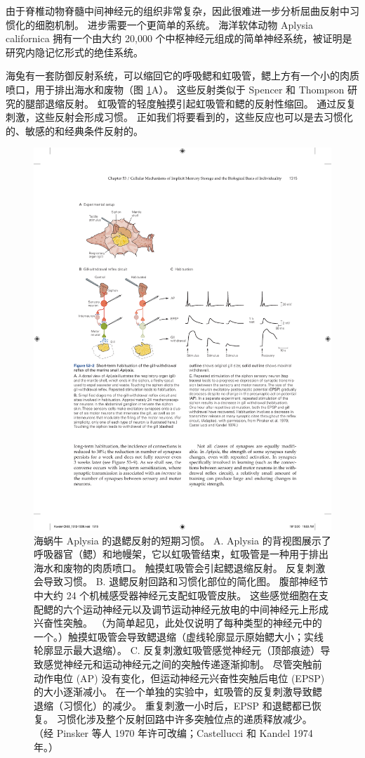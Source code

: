 由于脊椎动物脊髓中间神经元的组织非常复杂，因此很难进一步分析屈曲反射中习惯化的细胞机制。 进步需要一个更简单的系统。 海洋软体动物 Aplysia californica 拥有一个由大约 20,000 个中枢神经元组成的简单神经系统，被证明是研究内隐记忆形式的绝佳系统。

海兔有一套防御反射系统，可以缩回它的呼吸鳃和虹吸管，鳃上方有一个小的肉质喷口，用于排出海水和废物（图 \ref{fig:53_2}A）。 这些反射类似于 Spencer 和 Thompson 研究的腿部退缩反射。 虹吸管的轻度触摸引起虹吸管和鳃的反射性缩回。 通过反复刺激，这些反射会形成习惯。 正如我们将要看到的，这些反应也可以是去习惯化的、敏感的和经典条件反射的。

\begin{figure}[htbp]
	\centering
	\includegraphics[width=0.9\linewidth]{chap53/fig_53_2}
	\caption{海蜗牛 Aplysia 的退鳃反射的短期习惯。 A. Aplysia 的背视图展示了呼吸器官（鳃）和地幔架，它以虹吸管结束，虹吸管是一种用于排出海水和废物的肉质喷口。 触摸虹吸管会引起鳃退缩反射。 反复刺激会导致习惯。 B. 退鳃反射回路和习惯化部位的简化图。 腹部神经节中大约 24 个机械感受器神经元支配虹吸管皮肤。 这些感觉细胞在支配鳃的六个运动神经元以及调节运动神经元放电的中间神经元上形成兴奋性突触。 （为简单起见，此处仅说明了每种类型的神经元中的一个。）触摸虹吸管会导致鳃退缩（虚线轮廓显示原始鳃大小；实线轮廓显示最大退缩）。 C. 反复刺激虹吸管感觉神经元（顶部痕迹）导致感觉神经元和运动神经元之间的突触传递逐渐抑制。 尽管突触前动作电位 (AP) 没有变化，但运动神经元兴奋性突触后电位 (EPSP) 的大小逐渐减小。 在一个单独的实验中，虹吸管的反复刺激导致鳃退缩（习惯化）的减少。 重复刺激一小时后，EPSP 和退鳃都已恢复。 习惯化涉及整个反射回路中许多突触位点的递质释放减少。 （经 Pinsker 等人 1970 年许可改编；Castellucci 和 Kandel 1974 年。）}
	\label{fig:53_2}
\end{figure}

